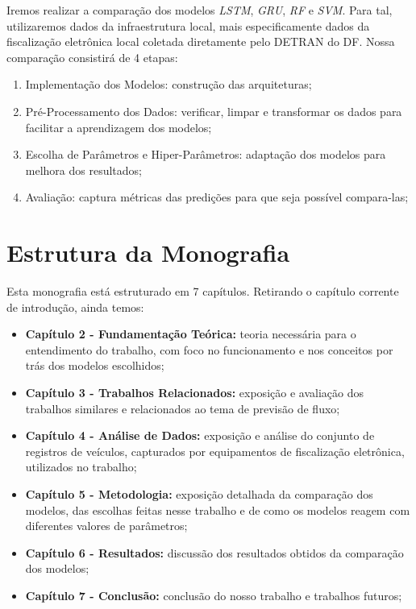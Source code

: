 Iremos realizar a comparação dos modelos  \textit{\acrshort{LSTM}}, \textit{\acrshort{GRU}}, \textit{\acrshort{RF}} e \textit{\acrshort{SVM}}. Para tal, utilizaremos dados da infraestrutura local, mais especificamente dados da fiscalização eletrônica local coletada diretamente pelo \acrfull{DETRAN} do \acrfull{DF}. Nossa comparação consistirá de 4 etapas:

\begin{enumerate}
    \item Implementação dos Modelos: construção das arquiteturas;
    \item Pré-Processamento dos Dados: verificar, limpar e transformar os dados para facilitar a aprendizagem dos modelos;
    \item Escolha de Parâmetros e Hiper-Parâmetros: adaptação dos modelos para melhora dos resultados;
    \item Avaliação: captura métricas das predições para que seja possível compara-las;
\end{enumerate}

\section{Estrutura da Monografia}

Esta monografia está estruturado em 7 capítulos. Retirando o capítulo corrente de introdução, ainda temos:

\begin{itemize}
    \item \textbf{Capítulo 2 - Fundamentação Teórica:} teoria necessária para o entendimento do trabalho, com foco no funcionamento e nos conceitos por trás dos modelos escolhidos;
    \item \textbf{Capítulo 3 - Trabalhos Relacionados:} exposição e avaliação dos trabalhos similares e relacionados ao tema de previsão de fluxo;
    \item \textbf{Capítulo 4 - Análise de Dados:} exposição e análise do conjunto de registros de veículos, capturados por equipamentos de fiscalização eletrônica, utilizados no trabalho;
    \item \textbf{Capítulo 5 - Metodologia:} exposição detalhada da comparação dos modelos, das escolhas feitas nesse trabalho e de como os modelos reagem com diferentes valores de parâmetros;
    \item \textbf{Capítulo 6 - Resultados:} discussão dos resultados obtidos da comparação dos modelos;
    \item \textbf{Capítulo 7 - Conclusão:} conclusão do nosso trabalho e trabalhos futuros;
\end{itemize}
